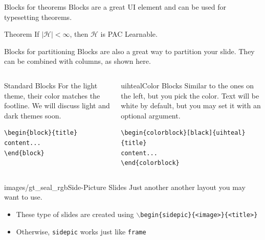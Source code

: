 \documentclass{beamer}
\begin{document}
\begin{frame}[fragile]{Blocks for theorems}
Blocks are a great UI element and can be used for typesetting theorems.
\begin{block}{Theorem}
If $\mid \mathcal{H} \mid < \infty$, then $\mathcal{H}$ is PAC Learnable.
\end{block}
\end{frame}


\begin{frame}[fragile]{Blocks for partitioning}
Blocks are also a great way to partition your slide. They can be combined with columns, as shown here.
\begin{columns}
\begin{column}{0.3\textwidth}
\begin{block}{Standard Blocks}
For the light theme, their color matches the footline. We will discuss light and dark themes soon.
\begin{verbatim}
\begin{block}{title}
content...
\end{block}
\end{verbatim}
\end{block}
\end{column}
\begin{column}{0.7\textwidth}
\begin{colorblock}[black]{uihteal}{Color Blocks}
Similar to the ones on the left, but you pick the color. Text will be white by 
default, but you may set it with an optional argument.
\small
\begin{verbatim}
\begin{colorblock}[black]{uihteal}{title}
content...
\end{colorblock}
\end{verbatim}
\end{colorblock}
\end{column}
\end{columns}
\end{frame}


\begin{sidepic}{images/gt_seal_rgb}{Side-Picture Slides}
Just another another layout you may want to use.
\begin{itemize}
\item These type of slides are created using \texttt{$\backslash$begin\{sidepic\}\{<image>\}\{<title>\}}
\item Otherwise, \texttt{sidepic} works just like \texttt{frame}
\end{itemize}
\end{sidepic}
\end{document}

